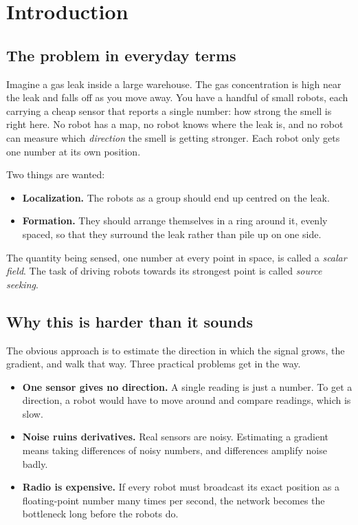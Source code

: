 \documentclass[11pt,a4paper]{article}
\begin{document}
\clearpage
\tableofcontents
\clearpage

\section{Introduction}

\subsection{The problem in everyday terms}

Imagine a gas leak inside a large warehouse. The gas concentration is high near the leak and falls
off as you move away. You have a handful of small robots, each carrying a cheap sensor that reports
a single number: how strong the smell is right here. No robot has a map, no robot knows where the
leak is, and no robot can measure which \emph{direction} the smell is getting stronger. Each robot
only gets one number at its own position.

Two things are wanted:

\begin{itemize}
    \item \textbf{Localization.} The robots as a group should end up centred on the leak.
    \item \textbf{Formation.} They should arrange themselves in a ring around it, evenly spaced, so
    that they surround the leak rather than pile up on one side.
\end{itemize}

The quantity being sensed, one number at every point in space, is called a \emph{scalar field}. The
task of driving robots towards its strongest point is called \emph{source seeking}.

\subsection{Why this is harder than it sounds}

The obvious approach is to estimate the direction in which the signal grows, the gradient, and walk
that way. Three practical problems get in the way.

\begin{itemize}
    \item \textbf{One sensor gives no direction.} A single reading is just a number. To get a
    direction, a robot would have to move around and compare readings, which is slow.
    \item \textbf{Noise ruins derivatives.} Real sensors are noisy. Estimating a gradient means
    taking differences of noisy numbers, and differences amplify noise badly.
    \item \textbf{Radio is expensive.} If every robot must broadcast its exact position as a
    floating-point number many times per second, the network becomes the bottleneck long before the
    robots do.
\end{itemize}
\end{document}
